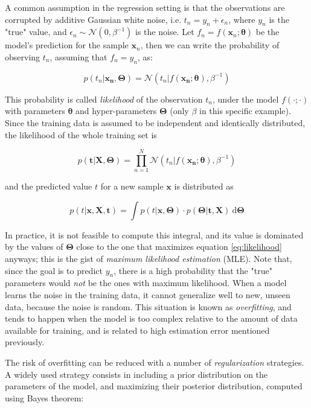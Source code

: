 \documentclass[a4paper,11pt]{kth-mag}
\begin{document}
A common assumption in the regression setting is that the observations are corrupted by additive Gaussian white noise, i.e. $t_n=y_n+\epsilon_n$, where $y_n$ is the "true" value, and $\epsilon_n\sim\mathcal{N}(0,\beta^{-1})$ is the noise. Let $f_n=f(\bm x_n;\bm{\theta})$ be the model's prediction for the sample $\bm x_n$, then we can write the probability of observing $t_n$, assuming that $f_n=y_n$, as:

\begin{equation}
\label{eq:model_pred_distrib}
p(t_n\vert \bm{x_n},\bm\Theta)=\mathcal{N}(t_n\vert f(\bm{x_n};\bm\theta),\beta^{-1})
\end{equation}

This probability is called \emph{likelihood} of the observation $t_n$, under the model $f(\cdot;\cdot)$ with parameters $\bm{\theta}$ and hyper-parameters $\bm\Theta$ (only $\beta$ in this specific example). Since the training data is assumed to be independent and identically distributed, the likelihood of the whole training set is

\begin{equation}
\label{eq:likelihood}
p(\bm{t}\vert\bm{X}, \bm\Theta)=\prod_{n=1}^N  \mathcal{N}(t_n\vert f(\bm{x_n};\bm\theta),\beta^{-1})
\end{equation}

\noindent and the predicted value $t$ for a new sample $\bm x$ is distributed as

\begin{equation}
p(t\vert \bm x, \bm X, \bm t)=\int
p(t\vert\bm x,\bm\Theta)\cdot p(\bm\Theta\vert \bm t, \bm X)\ \text{d}\bm\Theta 
\end{equation}

In practice, it is not feasible to compute this integral, and its value is dominated by the values of $\bm\Theta$ close to the one that maximizes equation \ref{eq:likelihood} anyways; this is the gist of \emph{maximum likelihood estimation} (MLE). Note that, since the goal is to predict $y_n$, there is a high probability that the "true" parameters would \emph{not} be the ones with maximum likelihood. When a model learns the noise in the training data, it cannot generalize well to new, unseen data, because the noise is random. This situation is known as \emph{overfitting}, and tends to happen when the model is too complex relative to the amount of data available for training, and is related to high estimation error mentioned previously.

The risk of overfitting can be reduced with a number of \emph{regularization} strategies. A widely used strategy consists in including a prior distribution on the parameters of the model, and maximizing their posterior distribution, computed using Bayes theorem:
\end{document}
